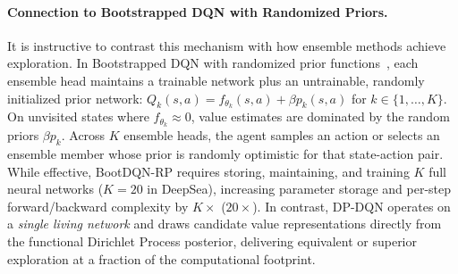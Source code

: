 \documentclass[10pt]{article}
\begin{document}
\paragraph{Connection to Bootstrapped DQN with Randomized Priors.}
It is instructive to contrast this mechanism with how ensemble methods achieve exploration. In Bootstrapped DQN with randomized prior functions~\citep{osband2018randomized}, each ensemble head maintains a trainable network plus an untrainable, randomly initialized prior network: $Q_k(s, a) = f_{\theta_k}(s, a) + \beta p_k(s, a)$ for $k \in \{1, \dots, K\}$. On unvisited states where $f_{\theta_k} \approx 0$, value estimates are dominated by the random priors $\beta p_k$. Across $K$ ensemble heads, the agent samples an action or selects an ensemble member whose prior is randomly optimistic for that state-action pair. While effective, BootDQN-RP requires storing, maintaining, and training $K$ full neural networks ($K=20$ in DeepSea), increasing parameter storage and per-step forward/backward complexity by $K\times$ ($20\times$). In contrast, DP-DQN operates on a \emph{single living network} and draws candidate value representations directly from the functional Dirichlet Process posterior, delivering equivalent or superior exploration at a fraction of the computational footprint.
\end{document}
